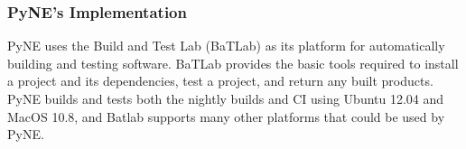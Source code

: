 \documentclass{anstrans}
\begin{document}
\subsubsection{PyNE's Implementation}

PyNE uses the Build and Test Lab (BaTLab) \cite{batlab_2014} as its platform for automatically 
building and testing software. BaTLab provides the basic tools required to
install a project and its dependencies, test a project, and return any built
products. PyNE builds and tests both the nightly builds and CI using
Ubuntu 12.04 and MacOS 10.8, and Batlab supports many other platforms that could be used by PyNE.

\end{document}
